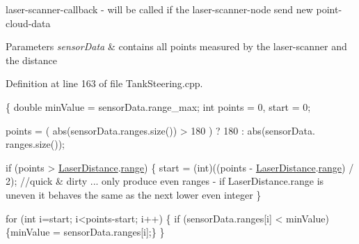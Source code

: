 laser-\/scanner-\/callback -\/ will be called if the laser-\/scanner-\/node send new point-\/cloud-\/data 


\begin{DoxyParams}{Parameters}
{\em sensor\-Data} & contains all points measured by the laser-\/scanner and the distance \\
\hline
\end{DoxyParams}


Definition at line 163 of file Tank\-Steering.\-cpp.


\begin{DoxyCode}
\{
    \textcolor{keywordtype}{double} minValue = sensorData.range\_max;
    \textcolor{keywordtype}{int} points = 0, start = 0;

    points = ( abs(sensorData.ranges.size()) > 180 ) ? 180 : abs(sensorData.
      ranges.size());

    \textcolor{keywordflow}{if} (points > \hyperlink{classTankSteering_a63ff23d449dca437f90e16f3a3684c20}{LaserDistance}.\hyperlink{structTankSteering_1_1distanceStruct_a3c3fec327c3233ffc23ad60179f8cec9}{range}) \{
        start = (int)((points - \hyperlink{classTankSteering_a63ff23d449dca437f90e16f3a3684c20}{LaserDistance}.\hyperlink{structTankSteering_1_1distanceStruct_a3c3fec327c3233ffc23ad60179f8cec9}{range}) / 2);    \textcolor{comment}{
      //quick & dirty ... only produce even ranges - if LaserDistance.range is uneven
       it behaves the same as the next lower even integer}
    \}

    \textcolor{keywordflow}{for} (\textcolor{keywordtype}{int} i=start; i<points-start; i++) \{
        \textcolor{keywordflow}{if} (sensorData.ranges[i] < minValue) \{minValue = sensorData.ranges[i];\}
    \}


\end{DoxyCode}
